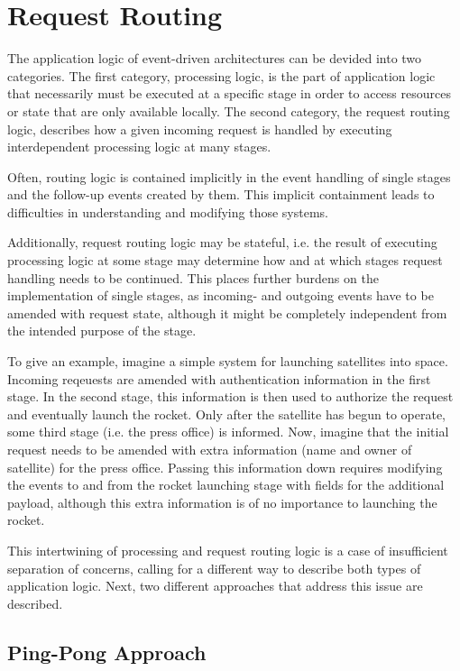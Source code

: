 \documentclass{sig-alternate}
\begin{document}
\section{Request Routing}

The application logic of event-driven architectures can be devided into two categories. The first
category, processing logic, is the part of application logic that necessarily must be executed at a
specific stage in order to access resources or state that are only available locally. The second
category, the request routing logic, describes how a given incoming request is handled by executing
interdependent processing logic at many stages.

Often, routing logic is contained implicitly in the event handling of single stages and the
follow-up events created by them. This implicit containment leads to difficulties in understanding
and modifying those systems.

Additionally, request routing logic may be stateful, i.e. the result of executing processing logic
at some stage may determine how and at which stages request handling needs to be continued. This
places further burdens on the implementation of single stages, as incoming- and outgoing events have
to be amended with request state, although it might be completely independent from the intended
purpose of the stage.

To give an example, imagine a simple system for launching satellites into space. Incoming
reqeuests are amended with authentication information in the first stage. In the second stage, this
information is then used to authorize the request and eventually launch the rocket. Only after the
satellite has begun to operate, some third stage (i.e. the press office) is informed.  Now, imagine
that the initial request needs to be amended with extra information (name and owner of satellite)
for the press office.  Passing this information down requires modifying the events to and from
the rocket launching stage with fields for the additional payload, although this extra information
is of no importance to launching the rocket.

This intertwining of processing and request routing logic is a case of insufficient separation of
concerns, calling for a different way to describe both types of application logic.  Next, two 
different approaches that address this issue are described.


\subsection{Ping-Pong Approach}
\end{document}
